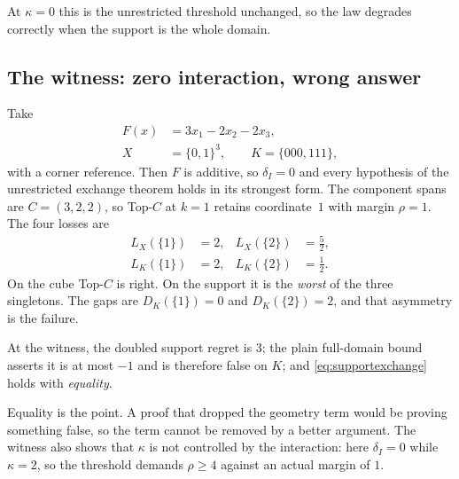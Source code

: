 
At $\kappa=0$ this is the unrestricted threshold unchanged, so the law degrades correctly
when the support is the whole domain.

\subsection{The witness: zero interaction, wrong answer}

Take
\begin{equation}
\begin{aligned}
F(x)&=3x_{1}-2x_{2}-2x_{3},\\
X&=\{0,1\}^{3},\qquad K=\{000,111\},
\end{aligned}
\label{eq:witness}
\end{equation}
with a corner reference. Then $F$ is additive, so $\delta_{I}=0$ and every hypothesis of
the unrestricted exchange theorem holds in its strongest form. The component spans are
$C=(3,2,2)$, so Top-$C$ at $k=1$ retains coordinate~$1$ with margin $\rho=1$. The four
losses are
\begin{equation}
\begin{aligned}
L_{X}(\{1\})&=2, & L_{X}(\{2\})&=\tfrac52,\\
L_{K}(\{1\})&=2, & L_{K}(\{2\})&=\tfrac12 .
\end{aligned}
\label{eq:witnesslosses}
\end{equation}
On the cube Top-$C$ is right. On the support it is the \emph{worst} of the three
singletons. The gaps are $D_{K}(\{1\})=0$ and $D_{K}(\{2\})=2$, and that asymmetry is the
failure.

\begin{theorem}
\label{thm:equality}
At the witness, the doubled support regret is $3$; the plain full-domain bound asserts it
is at most $-1$ and is therefore false on $K$; and \eqref{eq:supportexchange} holds with
\emph{equality}.
\end{theorem}


Equality is the point. A proof that dropped the geometry term would be proving something
false, so the term cannot be removed by a better argument. The witness also shows that
$\kappa$ is not controlled by the interaction: here $\delta_{I}=0$ while $\kappa=2$, so the
threshold demands $\rho\ge4$ against an actual margin of $1$.

